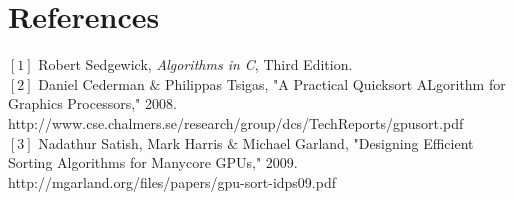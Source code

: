 \documentclass{article}
\begin{document}
\section{References}
$[1]$ Robert Sedgewick, {\em Algorithms in C}, Third Edition.\\
$[2]$ Daniel Cederman $\&$ Philippas Tsigas, "A Practical Quicksort ALgorithm for Graphics Processors," 2008. http://www.cse.chalmers.se/research/group/dcs/TechReports/gpusort.pdf\\
$[3]$ Nadathur Satish, Mark Harris $\&$ Michael Garland, "Designing Efficient Sorting Algorithms for Manycore GPUs," 2009. http://mgarland.org/files/papers/gpu-sort-idps09.pdf\\
\end{document}
